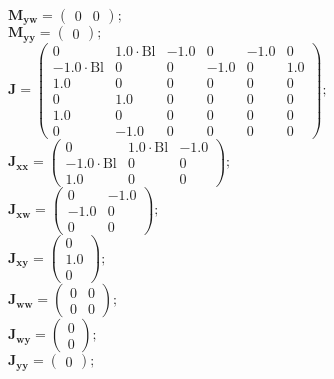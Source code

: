 \documentclass[11pt, oneside]{article}      %
\begin{document}
%
\\
%
$ \mathbf{M_{yw}} = \left(\begin{array}{cc}0 & 0\end{array}\right) ; $ 
%
\\
%
$ \mathbf{M_{yy}} = \left(\begin{array}{c}0\end{array}\right) ; $ 
%
\\
%
$ \mathbf{J} = \left(\begin{array}{cccccc}0 & 1.0 \cdot \mathrm{Bl} & -1.0 & 0 & -1.0 & 0\\- 1.0 \cdot \mathrm{Bl} & 0 & 0 & -1.0 & 0 & 1.0\\1.0 & 0 & 0 & 0 & 0 & 0\\0 & 1.0 & 0 & 0 & 0 & 0\\1.0 & 0 & 0 & 0 & 0 & 0\\0 & -1.0 & 0 & 0 & 0 & 0\end{array}\right) ; $ 
%
\\
%
$ \mathbf{J_{xx}} = \left(\begin{array}{ccc}0 & 1.0 \cdot \mathrm{Bl} & -1.0\\- 1.0 \cdot \mathrm{Bl} & 0 & 0\\1.0 & 0 & 0\end{array}\right) ; $ 
%
\\
%
$ \mathbf{J_{xw}} = \left(\begin{array}{cc}0 & -1.0\\-1.0 & 0\\0 & 0\end{array}\right) ; $ 
%
\\
%
$ \mathbf{J_{xy}} = \left(\begin{array}{c}0\\1.0\\0\end{array}\right) ; $ 
%
\\
%
$ \mathbf{J_{ww}} = \left(\begin{array}{cc}0 & 0\\0 & 0\end{array}\right) ; $ 
%
\\
%
$ \mathbf{J_{wy}} = \left(\begin{array}{c}0\\0\end{array}\right) ; $ 
%
\\
%
$ \mathbf{J_{yy}} = \left(\begin{array}{c}0\end{array}\right) ; $ 
%
\\
\end{document}
